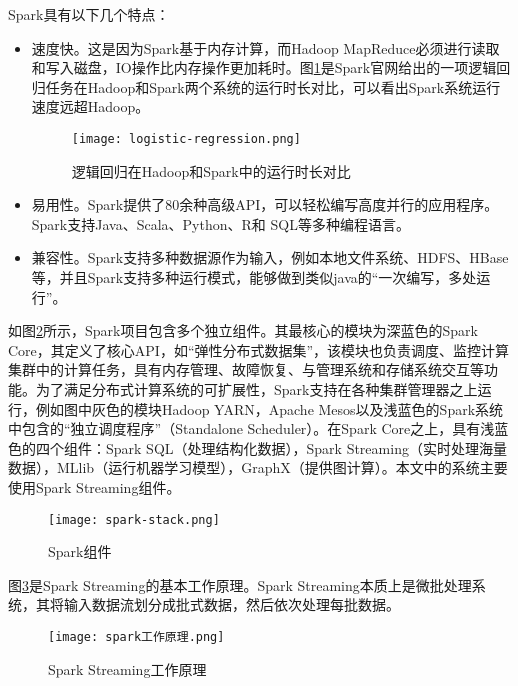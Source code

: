 Spark具有以下几个特点：

\begin{itemize}
  \item 速度快。这是因为Spark基于内存计算，而Hadoop MapReduce必须进行读取和写入磁盘，IO操作比内存操作更加耗时。图\ref{fig:Logistic regression in Hadoop and Spark}是Spark官网给出的一项逻辑回归任务在Hadoop和Spark两个系统的运行时长对比，可以看出Spark系统运行速度远超Hadoop。
   \begin{figure}
    \centering
    \texttt{[image: logistic-regression.png]}
    \caption{逻辑回归在Hadoop和Spark中的运行时长对比}
    \label{fig:Logistic regression in Hadoop and Spark}
  \end{figure}
  \item 易用性。Spark提供了80余种高级API，可以轻松编写高度并行的应用程序。Spark支持Java、Scala、Python、R和 SQL等多种编程语言。
  \item 兼容性。Spark支持多种数据源作为输入，例如本地文件系统、HDFS、HBase等，并且Spark支持多种运行模式，能够做到类似java的“一次编写，多处运行”。
\end{itemize}



如图\ref{fig:Spark组件}所示，Spark项目包含多个独立组件\cite{spark}。其最核心的模块为深蓝色的Spark Core，其定义了核心API，如“弹性分布式数据集”，该模块也负责调度、监控计算集群中的计算任务，具有内存管理、故障恢复、与管理系统和存储系统交互等功能。为了满足分布式计算系统的可扩展性，Spark支持在各种集群管理器之上运行，例如图中灰色的模块Hadoop YARN，Apache Mesos以及浅蓝色的Spark系统中包含的“独立调度程序”（Standalone Scheduler）。在Spark Core之上，具有浅蓝色的四个组件：Spark SQL（处理结构化数据），Spark Streaming（实时处理海量数据），MLlib（运行机器学习模型），GraphX（提供图计算）。本文中的系统主要使用Spark Streaming组件。



\begin{figure}
  \centering
  \texttt{[image: spark-stack.png]}
  \caption{Spark组件}
  \label{fig:Spark组件}
\end{figure}

图\ref{fig:spark工作原理}是Spark Streaming的基本工作原理\cite{spark}。Spark Streaming本质上是微批处理系统，其将输入数据流划分成批式数据，然后依次处理每批数据。
\begin{figure}
  \centering
  \texttt{[image: spark工作原理.png]}
  \caption{Spark Streaming工作原理}
  \label{fig:spark工作原理}
\end{figure}

